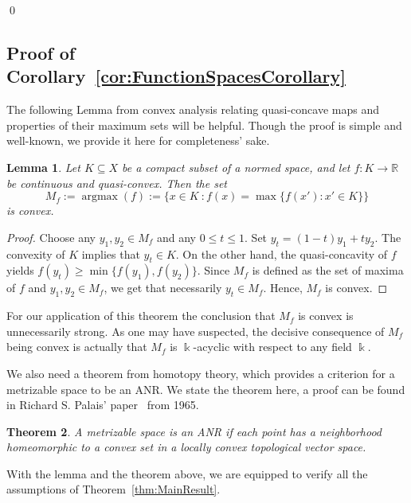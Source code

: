 \documentclass[a4paper,11pt,reqno,english]{amsart}
\newtheorem{theorem}{Theorem}[section]
\newtheorem{lemma}[theorem]{Lemma}
\theoremstyle{definition}
\newcommand\R{\mathbb R}
\begin{document}
\qed


\subsection{Proof of Corollary~\ref{cor:FunctionSpacesCorollary}}
The following Lemma from convex analysis relating quasi-concave maps and properties of their maximum sets will be helpful. Though the proof is simple and well-known, we provide it here for completeness' sake.

\begin{lemma}\label{lem:QuasiConcaveMaximumSet}
	Let $K\subseteq X$ be a compact subset of a normed space, and let $f\colon K\longrightarrow\R$ be continuous and quasi-convex. Then the set
	\begin{displaymath}
		M_f := \operatorname{argmax}(f) := \big\{x\in K\ : f(x)=\max\{f(x') : x'\in K\} \big\}
	\end{displaymath}
	is convex.
\end{lemma}
\begin{proof}
	Choose any $y_1, y_2\in M_f$ and any $0\leq t\leq 1$.
	Set $y_t=(1-t)y_1+ty_2$.
	The convexity of $K$ implies that $y_t\in K$.
	On the other hand, the quasi-concavity of $f$ yields $f(y_t)\geq \min\{f(y_1),f(y_2)\}$.
	Since $M_f$ is defined as the set of maxima of $f$ and $y_1,y_2\in M_f$, we get that necessarily $y_t\in  M_f$.
	Hence, $M_f$ is convex.
\end{proof}

For our application of this theorem the conclusion that $M_f$ is convex is unnecessarily strong. As one may have suspected, the decisive consequence of $M_f$ being convex is actually that $M_f$ is $\Bbbk$-acyclic with respect to any field $\Bbbk$.

We also need a theorem from homotopy theory, which provides a criterion for a metrizable space to be an ANR. We state the theorem here, a proof can be found in Richard S. Palais' paper~\cite[Thm.\,5]{Palai1965} from 1965.
\begin{theorem}\label{thm:LCTVSANRconditionsPalais}
	A metrizable space is an ANR if each point has a neighborhood homeomorphic to a convex set in a locally convex topological vector space.
\end{theorem}

With the lemma and the theorem above, we are equipped to verify all the assumptions of Theorem~\ref{thm:MainResult}.
\end{document}
